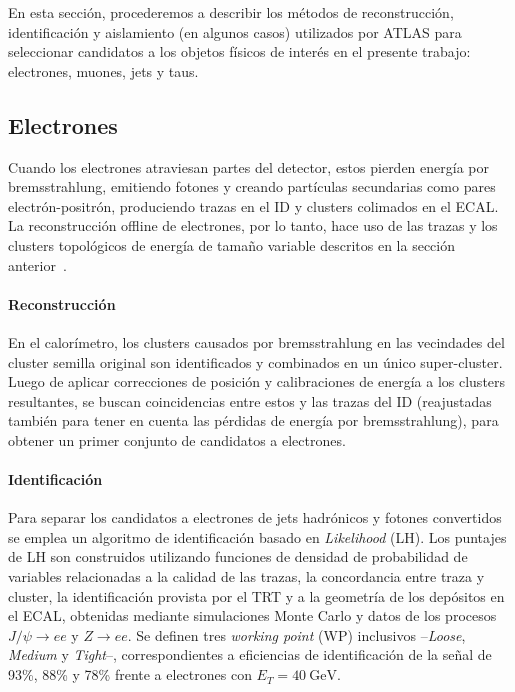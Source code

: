 En esta sección, procederemos a describir los métodos de reconstrucción, identificación y aislamiento (en algunos casos) utilizados por ATLAS para seleccionar candidatos a los objetos físicos de interés en el presente trabajo: electrones, muones, jets y taus.

\subsection{Electrones}

Cuando los electrones atraviesan partes del detector, estos pierden energía por bremsstrahlung, emitiendo fotones y creando partículas secundarias como pares electrón-positrón, produciendo trazas en el ID y clusters colimados en el ECAL. La reconstrucción offline de electrones, por lo tanto, hace uso de las trazas y los clusters topológicos de energía de tamaño variable descritos en la sección anterior~\cite{TheATLASCollaboration2019}. 

\paragraph{Reconstrucción}

En el calorímetro, los clusters causados por bremsstrahlung en las vecindades del cluster semilla original son identificados y combinados en un único super-cluster. Luego de aplicar correcciones de posición y calibraciones de energía a los clusters resultantes, se buscan coincidencias entre estos y las trazas del ID (reajustadas también para tener en cuenta las pérdidas de energía por bremsstrahlung), para obtener un primer conjunto de candidatos a electrones.

\paragraph{Identificación}

Para separar los candidatos a electrones de jets hadrónicos y fotones convertidos se emplea un algoritmo de identificación basado en \textit{Likelihood} (LH). Los puntajes de LH son construidos utilizando funciones de densidad de probabilidad de variables relacionadas a la calidad de las trazas, la concordancia entre traza y cluster, la identificación provista por el TRT y a la geometría de los depósitos en el ECAL, obtenidas mediante simulaciones Monte Carlo y datos de los procesos $J/\psi \to ee$ y $Z \to ee$. Se definen tres \textit{working point} (WP) inclusivos --\textit{Loose}, \textit{Medium} y \textit{Tight}--, correspondientes a eficiencias de identificación de la señal de 93\%, 88\% y 78\% frente a electrones con $E_T = \SI{40}{\GeV}$.

